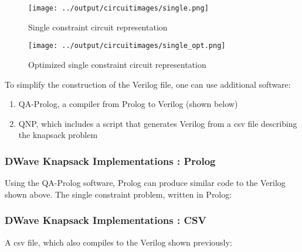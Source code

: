 \documentclass{article}
\begin{document}
\lstset{language=Verilog}


\newpage
\begin{figure}[h!]
  \texttt{[image: ../output/circuitimages/single.png]}
  \caption{Single constraint circuit representation}
  \label{fig:single}
\end{figure}
\begin{figure}[h!]
  \texttt{[image: ../output/circuitimages/single\_opt.png]}
  \caption{Optimized single constraint circuit representation}
  \label{fig:opt_single}
\end{figure}
\newpage

To simplify the construction of the Verilog file, one can use additional software:
\begin{enumerate}
    \item{QA-Prolog, a compiler from Prolog to Verilog (shown below)}
    \item{QNP, which includes a script that generates Verilog from a csv file describing the knapsack problem}
\end{enumerate}

\newpage

\subsubsection{DWave Knapsack Implementations : Prolog}

Using the QA-Prolog software, Prolog can produce similar code to the Verilog shown above.
The single constraint problem, written in Prolog:
\lstset{language=Prolog}


\subsubsection{DWave Knapsack Implementations : CSV}

A csv file, which also compiles to the Verilog shown previously:

\end{document}
